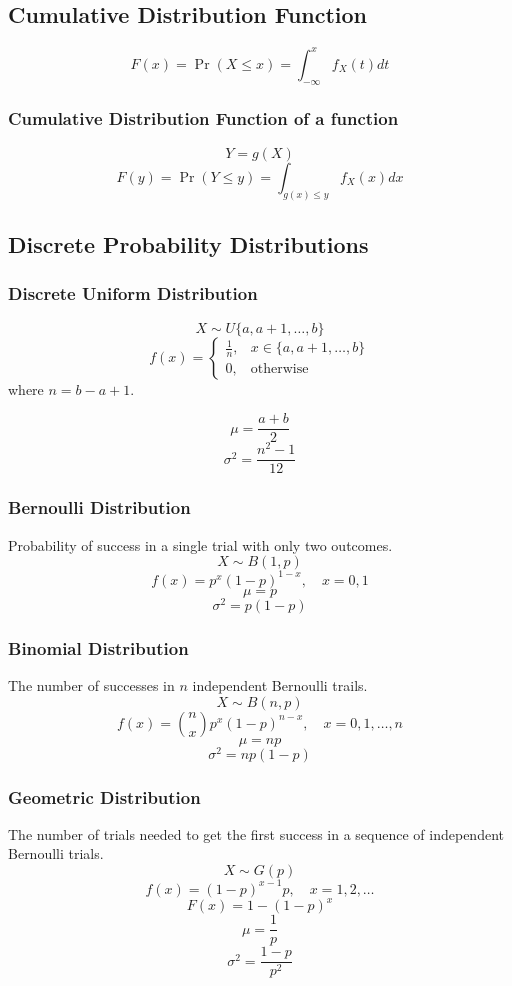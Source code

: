\documentclass{article}
\begin{document}
\subsection{Cumulative Distribution Function}
\[
    F(x) = \Pr(X \le x) = \int_{-\infty}^{x} f_X(t)dt
\]

\subsubsection{Cumulative Distribution Function of a function}
\[
    Y=g(X)
\]
\[
    F(y) = \Pr(Y \le y) = \int_{g(x) \le y} f_X(x)dx
\]

\subsection{Discrete Probability Distributions}

\subsubsection{Discrete Uniform Distribution}
\[
    X \sim U\{a, a+1, \dots, b\}
\]
\[
    f(x) =
    \begin{cases}
        \frac{1}{n}, & x \in \{a, a+1, \dots, b\} \\
        0, & \text{otherwise}
    \end{cases}
\]
where $n = b - a + 1$.

\[
    \mu = \frac{a + b}{2}
\]
\[
    \sigma^2 = \frac{n^2 - 1}{12}
\]

\subsubsection{Bernoulli Distribution}
Probability of success in a single trial with only two outcomes.
\[ X \sim B(1,p) \]
\[ f(x) = p^x (1-p)^{1-x}, \quad x=0,1 \]
\[ \mu = p \]
\[ \sigma^2 = p(1-p) \]

\subsubsection{Binomial Distribution}
The number of successes in \( n \) independent Bernoulli trails.
\[ X \sim B(n,p) \]
\[ f(x) = \binom{n}{x} p^x (1-p)^{n-x}, \quad x=0,1,\dots,n \]
\[ \mu = np \]
\[ \sigma^2 = np(1-p) \]

\subsubsection{Geometric Distribution}
The number of trials needed to get the first success in a sequence of independent Bernoulli trials.
\[ X \sim G(p) \]
\[ f(x) = (1-p)^{x-1}p, \quad x=1,2,\dots \]
\[ F(x) = 1 - (1-p)^x \]
\[ \mu = \frac{1}{p} \]
\[ \sigma^2 = \frac{1-p}{p^2} \]
\end{document}
